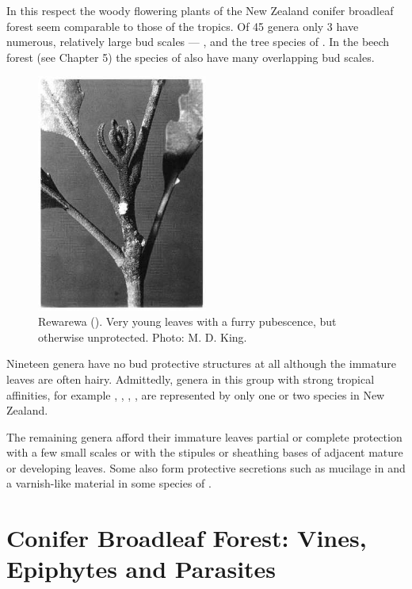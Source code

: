 In this respect the woody flowering plants of the New Zealand conifer broadleaf forest seem comparable to those of the tropics.
Of 45 genera only 3 have numerous, relatively large bud scales — ,  and the tree species of .
In the beech forest (see Chapter 5) the species of  also have many overlapping bud scales.

\begin{figure}
	\includegraphics[width=0.5\textwidth]{graphics/figure25rewarewa.jpg}
	\centering
	\caption[Rewarewa leaves]{Rewarewa ().
    Very young leaves with a furry pubescence, but otherwise unprotected.
	Photo: M. D. King.}
	\label{fig:25rewarewa}
\end{figure}

Nineteen genera have no bud protective structures at all although the immature leaves are often hairy.
Admittedly, genera in this group with strong tropical affinities, for example , , , , are represented by only one or two species in New Zealand.

The remaining genera afford their immature leaves partial or complete protection with a few small scales or with the stipules or sheathing bases of adjacent mature or developing leaves.
Some also form protective secretions such as mucilage in  and a varnish-like material in some species of .

\chapter{Conifer Broadleaf Forest: Vines, Epiphytes and Parasites}


